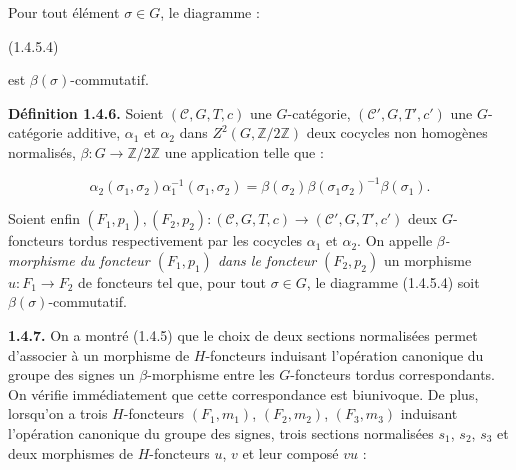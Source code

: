 %
Pour tout élément $\sigma\in G$, le diagramme :

\begin{center}
  \hfill\textup{(1.4.5.4)}
\end{center}
est $\beta(\sigma)$-commutatif.

\noindent\textbf{Définition 1.4.6.}\quad
Soient $(\mathcal C,G,T,c)$ une $G$-catégorie,
$(\mathcal C',G,T',c')$ une $G$-catégorie additive,
$\alpha_1$ et $\alpha_2$ dans $Z^2(G,\mathbb Z/2\mathbb Z)$ deux
cocycles non homogènes normalisés,
$\beta\colon G\to\mathbb Z/2\mathbb Z$ une application telle que :

\begin{equation}
  \alpha_2(\sigma_1,\sigma_2)\alpha_1^{-1}(\sigma_1,\sigma_2)
  =\beta(\sigma_2)\beta(\sigma_1\sigma_2)^{-1}\beta(\sigma_1).
  \tag{1.4.6.1}
\end{equation}

Soient enfin
$(F_1,p_1),(F_2,p_2)\colon(\mathcal C,G,T,c)
\to(\mathcal C',G,T',c')$ deux $G$-foncteurs tordus respectivement
par les cocycles $\alpha_1$ et $\alpha_2$. On appelle
\emph{$\beta$-morphisme du foncteur $(F_1,p_1)$ dans le foncteur
$(F_2,p_2)$} un morphisme $u\colon F_1\to F_2$ de foncteurs tel que,
pour tout $\sigma\in G$, le diagramme (1.4.5.4) soit
$\beta(\sigma)$-commutatif.

\noindent\textbf{1.4.7.}\quad
On a montré (1.4.5) que le choix de deux sections normalisées permet
d'associer à un morphisme de $H$-foncteurs induisant l'opération
canonique du groupe des signes un $\beta$-morphisme entre les
$G$-foncteurs tordus correspondants. On vérifie immédiatement que
cette correspondance est biunivoque. De plus, lorsqu'on a trois
$H$-foncteurs $(F_1,m_1)$, $(F_2,m_2)$, $(F_3,m_3)$ induisant
l'opération canonique du groupe des signes, trois sections normalisées
$s_1$, $s_2$, $s_3$ et deux morphismes de $H$-foncteurs $u$, $v$ et
leur composé $vu$ :

